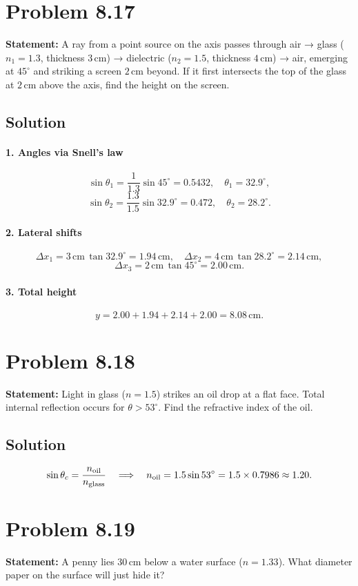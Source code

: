 \section*{Problem 8.17}
\textbf{Statement:} A ray from a point source on the axis passes through air → glass ($n_1=1.3$, thickness $3\,$cm) → dielectric ($n_2=1.5$, thickness $4\,$cm) → air, emerging at $45^\circ$ and striking a screen $2\,$cm beyond. If it first intersects the top of the glass at $2\,$cm above the axis, find the height on the screen.

\subsection*{Solution}
\paragraph{1. Angles via Snell’s law}
\[
\sin\theta_1 = \frac{1}{1.3}\sin45^\circ = 0.5432,\quad \theta_1 = 32.9^\circ,
\]
\[
\sin\theta_2 = \frac{1.3}{1.5}\sin32.9^\circ = 0.472,\quad \theta_2 = 28.2^\circ.
\]
\paragraph{2. Lateral shifts}
\[
\Delta x_1 = 3\,\mathrm{cm}\,\tan32.9^\circ = 1.94\,\mathrm{cm},
\quad
\Delta x_2 = 4\,\mathrm{cm}\,\tan28.2^\circ = 2.14\,\mathrm{cm},
\]
\[
\Delta x_3 = 2\,\mathrm{cm}\,\tan45^\circ = 2.00\,\mathrm{cm}.
\]
\paragraph{3. Total height}
\[
y = 2.00 + 1.94 + 2.14 + 2.00 = 8.08\,\mathrm{cm}.
\]

\section*{Problem 8.18}
\textbf{Statement:} Light in glass ($n=1.5$) strikes an oil drop at a flat face. Total internal reflection occurs for $\theta > 53^\circ$. Find the refractive index of the oil.

\subsection*{Solution}
\[
\sin\theta_c = \frac{n_{\rm oil}}{n_{\rm glass}}
\quad\Longrightarrow\quad
n_{\rm oil} = 1.5 \sin53^\circ = 1.5 \times 0.7986 \approx 1.20.
\]

\section*{Problem 8.19}
\textbf{Statement:} A penny lies $30\,$cm below a water surface ($n=1.33$). What diameter paper on the surface will just hide it?


